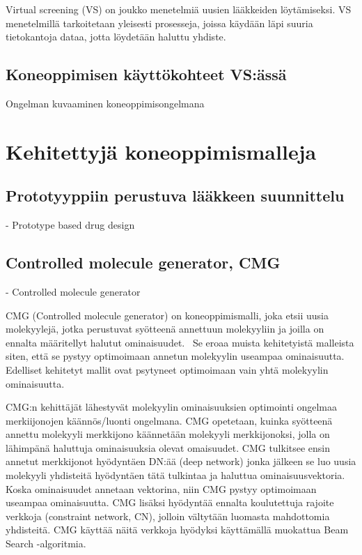 \documentclass[finnish,twoside,censored,subject,sw-line]{HYthesisML}
\begin{document}
Virtual screening (VS) on joukko menetelmiä uusien lääkkeiden löytämiseksi.
VS menetelmillä tarkoitetaan yleisesti prosesseja, joissa käydään läpi suuria tietokantoja dataa, jotta löydetään haluttu yhdiste.~\cite{SotrifferChristoph2011VSPC}

\subsection{Koneoppimisen käyttökohteet VS:ässä}

Ongelman kuvaaminen koneoppimisongelmana~\cite{ShaharHarelAndKiraRadinsky,KadurinArtur2017dAAG}

\section{Kehitettyjä koneoppimismalleja}

\subsection{Prototyyppiin perustuva lääkkeen suunnittelu}
- Prototype based drug design~\cite{ShaharHarelAndKiraRadinsky}

\subsection{Controlled molecule generator, CMG}
- Controlled molecule generator~\cite{ShinBonggun}

CMG (Controlled molecule generator) on koneoppimismalli, joka etsii uusia molekyylejä, jotka perustuvat syötteenä annettuun molekyyliin ja joilla on ennalta määritellyt halutut ominaisuudet.~\cite{ShinBonggun}
Se eroaa muista kehitetyistä malleista siten, että se pystyy optimoimaan annetun molekyylin useampaa ominaisuutta.
Edelliset kehitetyt mallit ovat psytyneet optimoimaan vain yhtä molekyylin ominaisuutta.

CMG:n kehittäjät lähestyvät molekyylin ominaisuuksien optimointi ongelmaa merkiijonojen käännös/luonti ongelmana.
CMG opetetaan, kuinka syötteenä annettu molekyyli merkkijono käännetään molekyyli merkkijonoksi, jolla on lähimpänä haluttuja ominaisuuksia olevat omaisuudet.
CMG tulkitsee ensin annetut merkkijonot hyödyntäen DN:ää (deep network) jonka jälkeen se luo uusia molekyyli yhdisteitä hyödyntäen tätä tulkintaa ja haluttua ominaisuusvektoria.
Koska ominaisuudet annetaan vektorina, niin CMG pystyy optimoimaan useampaa ominaisuutta.
CMG lisäksi hyödyntää ennalta koulutettuja rajoite verkkoja (constraint network, CN), jolloin vältytään luomasta mahdottomia yhdisteitä.
CMG käyttää näitä verkkoja hyödyksi käyttämällä muokattua Beam Search -algoritmia.
\end{document}
